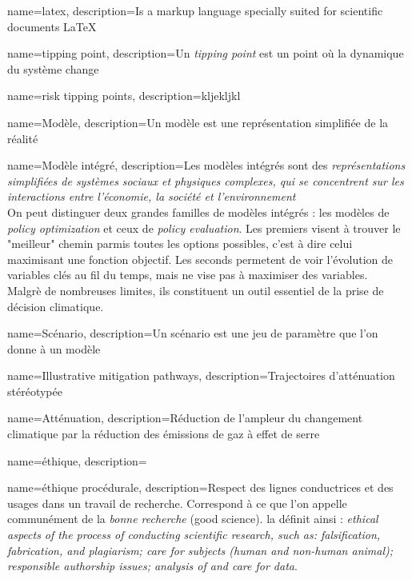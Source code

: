 {
    name=latex,
    description={Is a markup language specially suited 
    for scientific documents \LaTeX}
}


{
    name=tipping point, 
    description={Un \textit{tipping point} est un point où la dynamique du système change \cite{acemoglu_colonial_2001} }
}

{
    name=risk tipping points, 
    description={kljekljkl}
}

{
    name=Modèle, 
    description={Un modèle est une représentation simplifiée de la réalité}
}

{
    name=Modèle intégré, 
    description={Les modèles intégrés sont des \textit{représentations simplifiées de systèmes sociaux et physiques complexes, qui se concentrent sur les interactions entre l'économie, la société et l'environnement} \cite{intergovernmental_panel_on_climate_change_ipcc_annex_2023}  \\
    On peut distinguer deux grandes familles de modèles intégrés : les modèles de \textit{policy optimization} et ceux de \textit{policy evaluation}. Les premiers visent à trouver le "meilleur" chemin parmis toutes les options possibles, c'est à dire celui maximisant une fonction objectif. Les seconds permetent de voir l'évolution de variables clés au fil du temps, mais ne vise pas à maximiser des variables. \\
    Malgrè de nombreuses limites, ils constituent un outil essentiel de la prise de décision climatique.
    }
}

{
    name=Scénario, 
    description={Un scénario est une jeu de paramètre que l'on donne à un modèle}
}

{
    name=Illustrative mitigation pathways, 
    description={Trajectoires d'atténuation stéréotypée}
}

{
    name=Atténuation, 
    description={Réduction de l'ampleur du changement climatique par la réduction des émissions de gaz à effet de serre}
}


{
    name=éthique, 
    description={}
}

{
    name=éthique procédurale, 
    description={Respect des lignes conductrices et des usages dans un travail de recherche. Correspond à ce que l'on appelle communément de la \textit{bonne recherche} (good science). \cite{tuana_leading_2010} la définit ainsi : \textit{ethical aspects of the process of conducting scientific research, such as: falsification, fabrication, and plagiarism; care for subjects (human and non-human animal); responsible authorship issues; analysis of and care for data}.}
}

